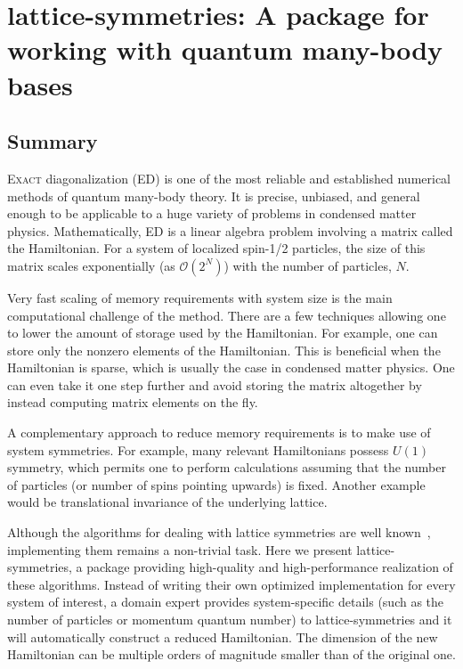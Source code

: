 \cleartoverso
\thispagestyle{empty}%
\BgThisPage
\clearpage
\chapter{lattice-symmetries: A package for working with quantum many-body bases}\label{ch:ls21}
\BgThisPage

\clearpage

\section{Summary}

\lettrine[lines=3]{E}{xact} diagonalization (ED) is one of the most reliable and established numerical methods of quantum many-body theory. It is precise, unbiased, and general enough to be applicable to a huge variety of problems in condensed matter physics. Mathematically, ED is a linear algebra problem involving a matrix called the Hamiltonian. For a system of localized spin-1/2 particles, the size of this matrix scales exponentially (as $\mathcal{O}(2^N)$) with the number of particles, $N$.

Very fast scaling of memory requirements with system size is the main computational challenge of the method. There are a few techniques allowing one to lower the amount of storage used by the Hamiltonian. For example, one can store only the nonzero elements of the Hamiltonian. This is beneficial when the Hamiltonian is sparse, which is usually the case in condensed matter physics. One can even take it one step further and avoid storing the matrix altogether by instead computing matrix elements on the fly.

A complementary approach to reduce memory requirements is to make use of system symmetries. For example, many relevant Hamiltonians possess $U(1)$ symmetry, which permits one to perform calculations assuming that the number of particles (or number of spins pointing upwards) is fixed. Another example would be translational invariance of the underlying lattice.

Although the algorithms for dealing with lattice symmetries are well known~\cite{Sandvi2010ComputationalS}, implementing them remains a non-trivial task. Here we present lattice-symmetries, a package providing high-quality and high-performance realization of these algorithms. Instead of writing their own optimized implementation for every system of interest, a domain expert provides system-specific details (such as the number of particles or momentum quantum number) to lattice-symmetries and it will automatically construct a reduced Hamiltonian. The dimension of the new Hamiltonian can be multiple orders of magnitude smaller than of the original one.

